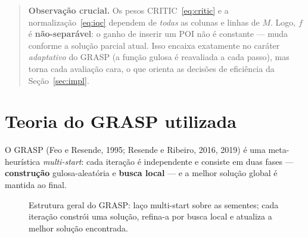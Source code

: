 \documentclass[11pt,a4paper]{article}
\begin{document}
\begin{quote}\small
\textbf{Observação crucial.} Os pesos CRITIC~\eqref{eq:critic} e a
normalização~\eqref{eq:iqc} dependem de \emph{todas} as colunas e linhas de $M$.
Logo, $f$ é \textbf{não-separável}: o ganho de inserir um POI não é constante ---
muda conforme a solução parcial atual. Isso encaixa exatamente no caráter
\emph{adaptativo} do GRASP (a função gulosa é reavaliada a cada passo), mas torna
cada avaliação cara, o que orienta as decisões de eficiência da
Seção~\ref{sec:impl}.
\end{quote}

\section{Teoria do GRASP utilizada}
\label{sec:teoria}

O GRASP (Feo e Resende, 1995; Resende e Ribeiro, 2016, 2019) é uma
meta-heurística \emph{multi-start}: cada iteração é independente e consiste em
duas fases --- \textbf{construção} gulosa-aleatória e \textbf{busca local} --- e a
melhor solução global é mantida ao final.

\begin{figure}[ht]
\centering
{}
\caption{Estrutura geral do GRASP: laço multi-start sobre as sementes;
cada iteração constrói uma solução, refina-a por busca local e atualiza a melhor
solução encontrada.}
\label{fig:grasp-flow}
\end{figure}
\end{document}
